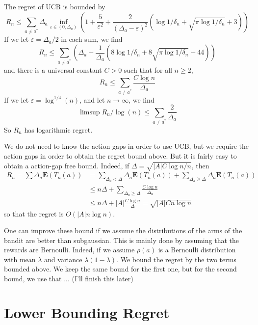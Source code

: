 \begin{theorem}
    The regret of UCB is bounded by
    \[ R_n \leq \sum_{a \neq a^*} \Delta_a \inf_{\varepsilon \in (0,\Delta_a)} \left(1 + \frac{5}{\varepsilon^2} + \frac{2}{(\Delta_a - \varepsilon)^2} \left(\log 1/\delta_n + \sqrt{\pi \log 1/\delta_n} + 3\right) \right) \]
    If we let $\varepsilon = \Delta_a/2$ in each sum, we find
    \[ R_n \leq \sum_{a \neq a^*} \left( \Delta_a + \frac{1}{\Delta_a} \left( 8 \log 1/\delta_n + 8 \sqrt{\pi \log 1 / \delta_n} + 44 \right) \right) \]
    and there is a universal constant $C > 0$ such that for all $n \geq 2$,
    \[ R_n \leq \sum_{a \neq a^*} \frac{C \log n}{\Delta_a} \]
    If we let $\varepsilon = \log^{1/4}(n)$, and let $n \to \infty$, we find
    \[ \limsup R_n/\log(n) \leq \sum_{a \neq a^*} \frac{2}{\Delta_a} \]
    So $R_n$ has logarithmic regret.
\end{theorem}

We do not need to know the action gaps in order to use UCB, but we require the action gaps in order to obtain the regret bound above. But it is fairly easy to obtain a action-gap free bound. Indeed, if $\Delta = \sqrt{|A| C \log n / n}$, then
%
\begin{align*}
    R_n = \sum \Delta_a \mathbf{E}(T_n(a)) &= \sum_{\Delta_a < \Delta} \Delta_a \mathbf{E}(T_n(a)) + \sum_{\Delta_a \geq \Delta} \Delta_a \mathbf{E}(T_n(a))\\
    &\leq n \Delta + \sum_{\Delta_a \geq \Delta} \frac{C \log n}{\Delta_a}\\
    &\leq n \Delta + |A| \frac{C \log n}{\Delta} = \sqrt{|A| C n \log n}
\end{align*}
%
so that the regret is $O(|A| n \log n)$.

One can improve these bound if we assume the distributions of the arms of the bandit are better than subgaussian. This is mainly done by assuming that the rewards are Bernoulli. Indeed, if we assume $\rho(a)$ is a Bernoulli distribution with mean $\lambda$ and variance $\lambda (1 - \lambda)$. We bound the regret by the two terms bounded above. We keep the same bound for the first one, but for the second bound, we use that ... (I'll finish this later)

\chapter{Lower Bounding Regret}

